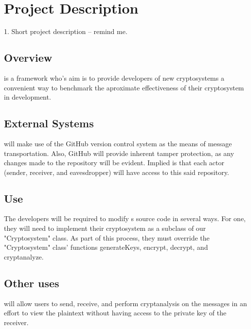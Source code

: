 \section{Project Description}

1. Short project description -- remind me.


\subsection{Overview}
\cry{} is a framework who's aim is to provide developers of
new cryptosystems a convenient way to benchmark the
aproximate effectiveness of their cryptosystem in
development.

\subsection{External Systems}
\cry{} will make use of the GitHub version control system
as the means of message transportation. Also, GitHub will
provide inherent tamper protection, as any changes made
to the repository will be evident. Implied is that each
actor (sender, receiver, and eavesdropper) will have access
to this said repository.

\subsection{Use}
The developers will be required to modify \cry{} s source
code in several ways. For one, they will need to implement
their cryptosystem as a subclass of our "Cryptosystem"
class. As part of this process, they must override the
"Cryptosystem" class' functions generateKeys, encrypt,
decrypt, and cryptanalyze.

\subsection{Other uses}
\cry{} will allow users to send, receive, and perform
cryptanalysis on the messages in an effort to view the
plaintext without having access to the private key of
the receiver.
